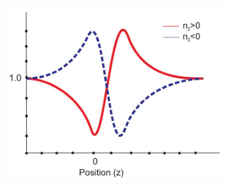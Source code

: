 \documentclass[%
 reprint,
 amsmath,amssymb,
 aps,
]{revtex4-2}
\begin{document}
		\begin{figure}
			\includegraphics[scale = 0.8]{n2lg}
			\caption{}
		\end{figure}
	
	
\end{document}
